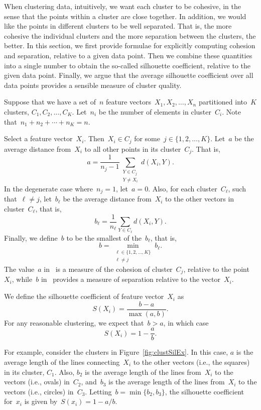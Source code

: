 \documentclass[12pt]{article}
\begin{document}
When clustering data, intuitively,
we want each cluster to be cohesive,
in the sense that the points within a cluster are close together. 
In addition, we would like the points in different 
clusters to be well separated.
That is, the more cohesive the individual clusters and
the more separation between the clusters, the better. 
In this section, we first provide formulae for
explicitly computing cohesion and separation, relative to a given data point. 
Then we combine these quantities into a single number to obtain the so-called 
silhouette coefficient, relative to the given data point. 
Finally, we argue that the average silhouette coefficient
over all data points provides a sensible measure of cluster quality.

Suppose that we have a set of~$n$ feature vectors~$X_1,X_2,\ldots,X_n$
partitioned into~$K$ clusters, $C_1,C_2,\ldots,C_K$. Let~$n_i$ be the
number of elements in cluster~$C_i$. Note that~$n_1+n_2+\cdots+n_K = n$.

Select a feature vector~$X_i$. Then~$X_i\in C_j$ for some~$j\in\{1,2,\ldots,K\}$.
Let~$a$ be the average distance from~$X_i$ to all other points in 
its cluster~$C_j$. That is, 
\begin{equation}\label{eq:clusterAAA}
  a =  \frac{1}{n_j - 1}\sum_{\substack{Y\in C_j\\ Y\neq X_i}} d(X_i,Y) .
\end{equation}
In the degenerate case where~$n_j = 1$, let~$a=0$.
Also, for each cluster~$C_{\ell}$, such that~$\ell\neq j$,  
let~$b_{\ell}$ be the average distance from~$X_i$
to the other vectors in cluster~$C_{\ell}$, that is,
$$
  b_{\ell} = \frac{1}{n_{\ell}}\sum_{Y\in C_{\ell}} d(X_i,Y) .
$$
Finally, we define~$b$ to be the smallest of the~$b_{\ell}$, that is,
\begin{equation}\label{eq:clusterBBB}
  b = \!\!\!\!\min_{\substack{\ell\in\{1,2,\ldots,K\}\\ \ell\neq j}}\!\!\!\! b_{\ell} .
\end{equation}
The value~$a$ in~ is a measure of the cohesion of cluster~$C_j$,
relative to the point~$X_i$, while~$b$ in~ provides 
a measure of separation relative to the vector~$X_i$.

We define the  silhouette coefficient of feature vector~$X_i$ as 
$$
  S(X_i) = \frac{b-a}{\max(a,b)} .
$$
For any reasonable clustering, we expect that~$b > a$, in which case
$$
  S(X_i) = 1 - \frac{a}{b} .
$$

For example, consider the clusters in Figure~\ref{fig:clustSilEx}. 
In this case, $a$ is the average length of the lines connecting~$X_i$
to the other vectors (i.e., the squares) in its cluster, $C_1$. Also, $b_2$ is the average 
length of the lines from~$X_i$ to the vectors (i.e., ovals) in~$C_2$,
and~$b_3$ is the average length of the lines 
from~$X_i$ to the vectors (i.e., circles) in~$C_3$.
Letting~$b=\min\{b_2,b_3\}$, the silhouette coefficient 
for~$x_i$ is given by~$S(x_i)=1-a/b$.
\end{document}
